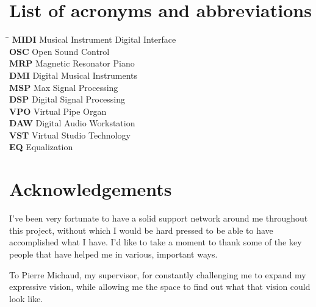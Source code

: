 \documentclass[12pt,twoside,maitrise]{dms_ks}
\theoremstyle{definition}
\begin{document}
{\chapter*{List of acronyms and abbreviations}
\begin{tabbing}
    \hspace{2cm} \= \kill %
    \textbf{MIDI} \> Musical Instrument Digital Interface \\
    \textbf{OSC} \> Open Sound Control \\
    \textbf{MRP} \> Magnetic Resonator Piano \\
    \textbf{DMI} \> Digital Musical Instruments \\
    \textbf{MSP} \> Max Signal Processing \\
    \textbf{DSP} \> Digital Signal Processing \\
    \textbf{VPO} \> Virtual Pipe Organ \\
    \textbf{DAW} \> Digital Audio Workstation \\
    \textbf{VST} \> Virtual Studio Technology \\
    \textbf{EQ}  \> Equalization \\
\end{tabbing}


\chapter*{Acknowledgements}

I've been very fortunate to have a solid support network around me throughout this project, without which I would be hard pressed to be able to have accomplished what I have.
I'd like to take a moment to thank some of the key people that have helped me in various, important ways.

To Pierre Michaud, my supervisor, for constantly challenging me to expand my expressive vision, while allowing me the space to find out what that vision could look like.

}
\end{document}

